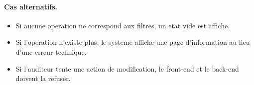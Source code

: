 \paragraph{Cas alternatifs.}
\begin{itemize}
  \item Si aucune operation ne correspond aux filtres, un etat vide est affiche.
  \item Si l'operation n'existe plus, le systeme affiche une page d'information au lieu d'une erreur technique.
  \item Si l'auditeur tente une action de modification, le front-end et le back-end doivent la refuser.
\end{itemize}
